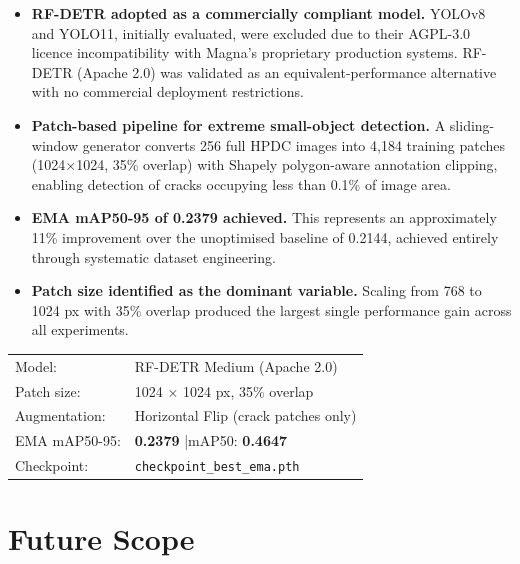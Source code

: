 \begin{itemize}[leftmargin=2em]
    \item \textbf{RF-DETR adopted as a commercially compliant model.} YOLOv8 and YOLO11, initially evaluated, were excluded due to their AGPL-3.0 licence incompatibility with Magna's proprietary production systems. RF-DETR (Apache 2.0) was validated as an equivalent-performance alternative with no commercial deployment restrictions.
    \item \textbf{Patch-based pipeline for extreme small-object detection.} A sliding-window generator converts 256 full HPDC images into 4,184 training patches (1024$\times$1024, 35\% overlap) with Shapely polygon-aware annotation clipping, enabling detection of cracks occupying less than 0.1\% of image area.
    \item \textbf{EMA mAP50-95 of 0.2379 achieved.} This represents an approximately 11\% improvement over the unoptimised baseline of 0.2144, achieved entirely through systematic dataset engineering.
    \item \textbf{Patch size identified as the dominant variable.} Scaling from 768 to 1024 px with 35\% overlap produced the largest single performance gain across all experiments.
\end{itemize}

\begin{resultbox}
\begin{tabular}{ll}
Model:          & RF-DETR Medium (Apache 2.0) \\
Patch size:     & 1024 $\times$ 1024 px, 35\% overlap \\
Augmentation:   & Horizontal Flip (crack patches only) \\
EMA mAP50-95:   & \textbf{0.2379} \quad|\quad mAP50: \textbf{0.4647} \\
Checkpoint:     & \texttt{checkpoint\_best\_ema.pth} \\
\end{tabular}
\end{resultbox}

\section*{Future Scope}

